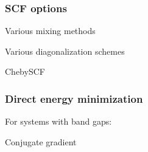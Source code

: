 \documentclass[english,9pt]{beamer}
\begin{document}
\begin{frame}
\frametitle{SCF options}

Various mixing methods

Various diagonalization schemes

ChebySCF

\end{frame}


\begin{frame}
\frametitle{Direct energy minimization}

For systems with band gaps:

Conjugate gradient

\end{frame}
\end{document}
